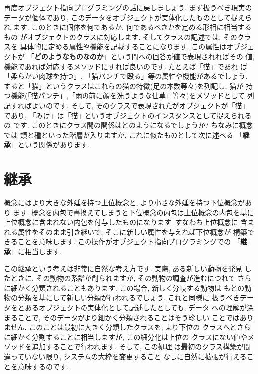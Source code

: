 再度オブジェクト指向プログラミングの話に戻しましょう. まず扱うべき現実の
データが個体であり, このデータをオブジェクトが実体化したものとして捉えられ
ます. このときに個体を何であるか, 何であるべきかを定める形相に相当するもの
がオブジェクトのクラスに対応します. そしてクラスの記述では, そのクラスを
具体的に定める属性や機能を記載することになります. この属性はオブジェクトが
「\textbf{どのようなものなのか}」という問への回答が値で表現されればその
値,  機能であれば対応するメソッドにすれば良いのです. たとえば「猫」であれ
ば「柔らかい肉球を持つ」, 「猫パンチで殴る」等の属性や機能があるでしょう.
 すると「猫」というクラスはこれらの猫の特徴(足の本数等々)を列記し, 猫が
持つ機能(「猫パンチ」,「雨の前に顔を洗うような仕草」等々)をメソッドとして
列記すればよいのです. そして, そのクラスで表現されたがオブジェクトが「猫」
であり, 「みけ」は「猫」というオブジェクトのインスタンスとして捉えられるの
です. このときにクラス間の関係はどのようになるでしょうか? ちなみに概念では
類と種といった階層が入りますが, これに似たものとして次に述べる
「\textbf{継承}」という関係があります.


\section{継承}


概念にはより大きな外延を持つ上位概念と, より小さな外延を持つ下位概念があり
ます. 概念を内包で書換えてしまうと下位概念の内包は上位概念の内包を基に
上位概念に含まれない内包を付与したものになります. すなわち上位概念に
含まれる属性をそのまま引き継いで, そこに新しい属性を与えれば下位概念が
構築できることを意味します. この操作がオブジェクト指向プログラミングでの
「\textbf{継承}」に相当します.
\newline


この継承という考えは非常に自然な考え方です. 実際, ある新しい動物を発見
したときに, その動物の系譜が創られますが, その動物の調査が進むにつれて
さらに細かく分類されることもあります. この場合, 新しく分岐する動物は
もとの動物の分類を基にして新しい分類が行われるでしょう. これと同様に
扱うべきデータをとあるオブジェクトの実体化として記述したとしても, データ
への理解が深まることで, そのデータがより細かく分類されることはそう珍しい
ことではありません. このことは最初に大きく分類したクラスを, より下位の
クラスへとさらに細かく分割することに相当しますが, この細分化は上位の
クラスにない値やメソッドを追加することで行われます. そして, この処理
は最初のクラス構築が間違っていない限り, システムの大枠を変更すること
なしに自然に拡張が行えることを意味するのです.
\newline


